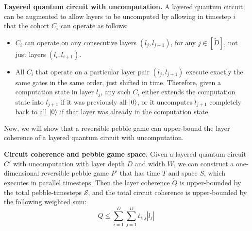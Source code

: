 \begin{definition}{\textbf{Layered quantum circuit with uncomputation.}}
A layered quantum circuit can be augmented to allow layers to be uncomputed
by allowing in timestep $i$ that the cohort $C_i$ can operate as follows:

\begin{itemize}
\item $C_i$ can operate on any consecutive layers $(l_{j},l_{j+1})$,
for any $j \in [\tilde{D}]$,
not just layers $(l_{i},l_{i+1})$.
\item All $C_i$ that operate on a particular layer pair $(l_{j},l_{j+1})$
execute exactly the same gates in the same order, just shifted in time.
Therefore, given a computation state in layer $l_{j}$, any such
$C_i$ either extends the computation state into $l_{j+1}$ if it
was previously all $\left\vert{0}\right\rangle$, or it uncomputes $l_{j+1}$ completely
back to all $\left\vert{0}\right\rangle$ if that layer was already in the computation state.
\end{itemize}
\end{definition}


Now, we will show that a reversible pebble game can upper-bound the
layer coherence of a layered quantum circuit with uncomputation.

\begin{theorem}{\textbf{Circuit coherence and pebble game space.}}
Given a layered quantum circuit $C'$ with uncomputation with layer depth $D$ and width $W$, we
can construct a one-dimensional
reversible pebble game $P'$ that has time $T$
and space $S$, which executes in parallel timesteps.
Then the layer coherence $\tilde{Q}$ is upper-bounded by the
total pebble-timesteps $\mathcal{S}$, and the total circuit coherence
is upper-bounded by the following weighted sum:
\begin{equation}
Q \le \sum_{i=1}^D \sum_{j=1}^D t_{i,j} |l_j|
\end{equation}
\label{thm:pg-cc}
\end{theorem}

